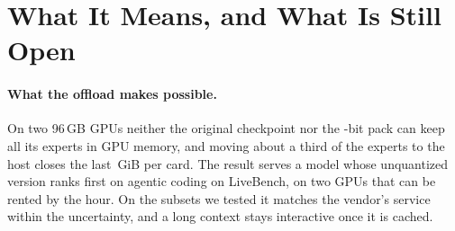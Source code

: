\section{What It Means, and What Is Still Open}\label{sec:discussion}

\paragraph{What the offload makes possible.}
On two 96\,GB GPUs neither the original checkpoint nor the -bit pack can keep all its experts in GPU
memory, and moving about a third of the experts to the host closes the last \,GiB per
card. The result serves a model whose unquantized version ranks first on agentic coding on LiveBench, on two GPUs that
can be rented by the hour. On the subsets we tested it matches the vendor's service within the uncertainty, and a long
context stays interactive once it is cached.

